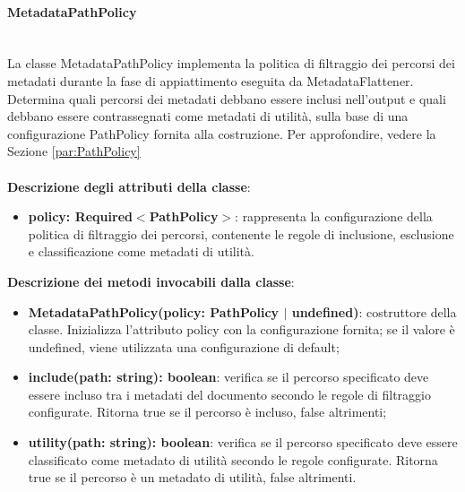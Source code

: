 \documentclass[a4paper,12pt]{article}
\begin{document}
{{{                \noindent \paragraph{MetadataPathPolicy}\label{par:MetadataPathPolicy}\mbox{}\\
                La classe MetadataPathPolicy implementa la politica di filtraggio dei percorsi dei metadati durante la fase di appiattimento eseguita da MetadataFlattener. Determina quali percorsi dei metadati debbano essere inclusi nell'output e quali debbano essere contrassegnati come metadati di utilità, sulla base di una configurazione PathPolicy fornita alla costruzione. Per approfondire, vedere la Sezione \ref{par:PathPolicy}\\
                \\
                \textbf{Descrizione degli attributi della classe}:
                \begin{itemize}
                    \item \textbf{policy: Required$<$PathPolicy$>$}: rappresenta la configurazione della politica di filtraggio dei percorsi, contenente le regole di inclusione, esclusione e classificazione come metadati di utilità.
                \end{itemize}
 
                \noindent \textbf{Descrizione dei metodi invocabili dalla classe}:
                \begin{itemize}
                    \item \textbf{MetadataPathPolicy(policy: PathPolicy $|$ undefined)}: costruttore della classe. Inizializza l'attributo policy con la configurazione fornita; se il valore è undefined, viene utilizzata una configurazione di default;
                    \item \textbf{include(path: string): boolean}: verifica se il percorso specificato deve essere incluso tra i metadati del documento secondo le regole di filtraggio configurate. Ritorna true se il percorso è incluso, false altrimenti;
                    \item \textbf{utility(path: string): boolean}: verifica se il percorso specificato deve essere classificato come metadato di utilità secondo le regole configurate. Ritorna true se il percorso è un metadato di utilità, false altrimenti.
                \end{itemize}
}}}
\end{document}

